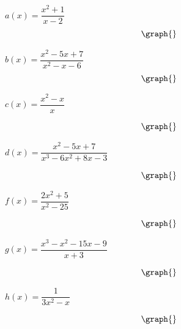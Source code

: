 \documentclass{ximera}
\begin{document}
\begin{question}
$a(x) = \dfrac{x^2+1}{x-2}$
\[
\graph{}
\]
\begin{selectAll}
\end{selectAll}

$b(x) = \dfrac{x^2-5x+7}{x^2-x-6}$
\[
\graph{}
\]

\begin{selectAll}
\end{selectAll}

$c(x) = \dfrac{x^2-x}{x}$

\[
\graph{}
\]

\begin{selectAll}
\end{selectAll}

$d(x) = \dfrac{x^2-5x+7}{x^3-6x^2+8x-3}$

\[
\graph{}
\]

\begin{selectAll}
\end{selectAll}

$f(x) = \dfrac{2x^2+5}{x^2-25}$

\[
\graph{}
\]

\begin{selectAll}
\end{selectAll}

$g(x) = \dfrac{x^3-x^2-15x-9}{x+3}$

\[
\graph{}
\]

\begin{selectAll}
\end{selectAll}

$h(x) = \dfrac{1}{3x^2-x}$

\[
\graph{}
\]

\begin{selectAll}
\end{selectAll}
\end{question}
\end{document}

